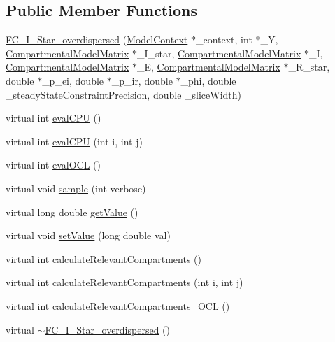 \subsection*{Public Member Functions}
\begin{DoxyCompactItemize}
\item 
\hyperlink{classSpatialSEIR_1_1FC__I__Star__overdispersed_ae01b90d643d41a1d040267154548cfbf}{F\-C\-\_\-\-I\-\_\-\-Star\-\_\-overdispersed} (\hyperlink{classSpatialSEIR_1_1ModelContext}{Model\-Context} $\ast$\-\_\-context, int $\ast$\-\_\-\-Y, \hyperlink{classSpatialSEIR_1_1CompartmentalModelMatrix}{Compartmental\-Model\-Matrix} $\ast$\-\_\-\-I\-\_\-star, \hyperlink{classSpatialSEIR_1_1CompartmentalModelMatrix}{Compartmental\-Model\-Matrix} $\ast$\-\_\-\-I, \hyperlink{classSpatialSEIR_1_1CompartmentalModelMatrix}{Compartmental\-Model\-Matrix} $\ast$\-\_\-\-E, \hyperlink{classSpatialSEIR_1_1CompartmentalModelMatrix}{Compartmental\-Model\-Matrix} $\ast$\-\_\-\-R\-\_\-star, double $\ast$\-\_\-p\-\_\-ei, double $\ast$\-\_\-p\-\_\-ir, double $\ast$\-\_\-phi, double \-\_\-steady\-State\-Constraint\-Precision, double \-\_\-slice\-Width)
\item 
virtual int \hyperlink{classSpatialSEIR_1_1FC__I__Star__overdispersed_ab9913de9f59f6a614b9a70d6d055b148}{eval\-C\-P\-U} ()
\item 
virtual int \hyperlink{classSpatialSEIR_1_1FC__I__Star__overdispersed_a35e7e87cda4bb50626598a63b1161d67}{eval\-C\-P\-U} (int i, int j)
\item 
virtual int \hyperlink{classSpatialSEIR_1_1FC__I__Star__overdispersed_ab3205feb288d0a8ce383904f527277cf}{eval\-O\-C\-L} ()
\item 
virtual void \hyperlink{classSpatialSEIR_1_1FC__I__Star__overdispersed_a49ec8bf35ee3122bc58fb2dbcfa35fcd}{sample} (int verbose)
\item 
virtual long double \hyperlink{classSpatialSEIR_1_1FC__I__Star__overdispersed_afc7b8947a99bfcd0abeb551542e47886}{get\-Value} ()
\item 
virtual void \hyperlink{classSpatialSEIR_1_1FC__I__Star__overdispersed_aeac6fb5229f36bb9e0a9db24ff6bc100}{set\-Value} (long double val)
\item 
virtual int \hyperlink{classSpatialSEIR_1_1FC__I__Star__overdispersed_a8e7bf521bf8f001a00fab473c297553c}{calculate\-Relevant\-Compartments} ()
\item 
virtual int \hyperlink{classSpatialSEIR_1_1FC__I__Star__overdispersed_a7455ba1ac215f3d00d37ecb6d3508006}{calculate\-Relevant\-Compartments} (int i, int j)
\item 
virtual int \hyperlink{classSpatialSEIR_1_1FC__I__Star__overdispersed_a8effecefb91a8c16a1a7a99d42326bf5}{calculate\-Relevant\-Compartments\-\_\-\-O\-C\-L} ()
\item 
virtual \hyperlink{classSpatialSEIR_1_1FC__I__Star__overdispersed_ab10730f38210464c51e5ed99460b8aac}{$\sim$\-F\-C\-\_\-\-I\-\_\-\-Star\-\_\-overdispersed} ()
\end{DoxyCompactItemize}
